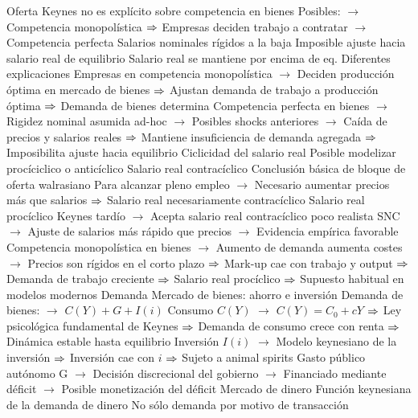 \documentclass{nuevotema}
\begin{document}
\begin{esquemal}
			\3 Oferta
				\4 Keynes no es explícito sobre competencia en bienes
				\4[] Posibles:
				\4[] $\to$ Competencia monopolística
				\4[] $\Rightarrow$ Empresas deciden trabajo a contratar
				\4[] $\to$ Competencia perfecta
				\4 Salarios nominales rígidos a la baja
				\4[] Imposible ajuste hacia salario real de equilibrio
				\4 Salario real se mantiene por encima de eq.
				\4 Diferentes explicaciones
				\4[] Empresas en competencia monopolística
				\4[] $\to$ Deciden producción óptima en mercado de bienes
				\4[] $\Rightarrow$ Ajustan demanda de trabajo a producción óptima
				\4[] $\Rightarrow$ Demanda de bienes determina
				\4[] Competencia perfecta en bienes
				\4[] $\to$ Rigidez nominal asumida ad-hoc
				\4[] $\to$ Posibles shocks anteriores
				\4[] $\to$ Caída de precios y salarios reales
				\4[] $\Rightarrow$ Mantiene insuficiencia de demanda agregada
				\4[] $\Rightarrow$ Imposibilita ajuste hacia equilibrio
				\4 Ciclicidad del salario real
				\4[] Posible modelizar procíciclico o anticíclico
				\4 Salario real contracíclico
				\4[] Conclusión básica de bloque de oferta walrasiano
				\4[] Para alcanzar pleno empleo
				\4[] $\to$ Necesario aumentar precios más que salarios
				\4[] $\Rightarrow$ Salario real necesariamente contracíclico
				\4 Salario real procíclico
				\4[] Keynes tardío
				\4[] $\to$ Acepta salario real contracíclico poco realista
				\4[] SNC
				\4[] $\to$ Ajuste de salarios más rápido que precios
				\4[] $\to$ Evidencia empírica favorable
				\4[] Competencia monopolística en bienes
				\4[] $\to$ Aumento de demanda aumenta costes
				\4[] $\to$ Precios son rígidos en el corto plazo
				\4[] $\Rightarrow$ Mark-up cae con trabajo y output
				\4[] $\Rightarrow$ Demanda de trabajo creciente
				\4[] $\Rightarrow$ Salario real procíclico
				\4[] $\Rightarrow$ Supuesto habitual en modelos modernos
			\3 Demanda
				\4[IS] Mercado de bienes: ahorro e inversión
				\4[] Demanda de bienes:
				\4[] $\to$ $C(Y) + G + I(i)$
				\4[] Consumo $C(Y)$
				\4[] $\to$ $C(Y) = C_0 + cY$
				\4[] $\Rightarrow$ Ley psicológica fundamental de Keynes
				\4[] $\Rightarrow$ Demanda de consumo crece con renta
				\4[] $\Rightarrow$ Dinámica estable hasta equilibrio
				\4[] Inversión $I(i)$
				\4[] $\to$ Modelo keynesiano de la inversión
				\4[] $\Rightarrow$ Inversión cae con $i$
				\4[] $\Rightarrow$ Sujeto a animal spirits
				\4[] Gasto público autónomo G
				\4[] $\to$ Decisión discrecional del gobierno
				\4[] $\to$ Financiado mediante déficit
				\4[] $\to$ Posible monetización del déficit
				\4[LM] Mercado de dinero
				\4[] Función keynesiana de la demanda de dinero
				\4[] No sólo demanda por motivo de transacción

\end{esquemal}
\end{document}
